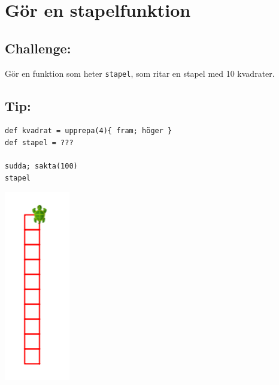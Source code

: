 \chapter{Gör en stapelfunktion}
\begin{multicols}{2}
\section*{\color{BrickRed}Challenge:}
Gör en funktion som heter \lstinline{stapel}, som ritar en stapel med 10 kvadrater.
\section*{\color{OliveGreen}Tip:}

\begin{lstlisting}[numbers=none]
def kvadrat = upprepa(4){ fram; höger }  
def stapel = ???

sudda; sakta(100)
stapel
\end{lstlisting}
        

\columnbreak

\begin{center}
\includegraphics{../img/square-column.png}
\end{center}

\end{multicols}

